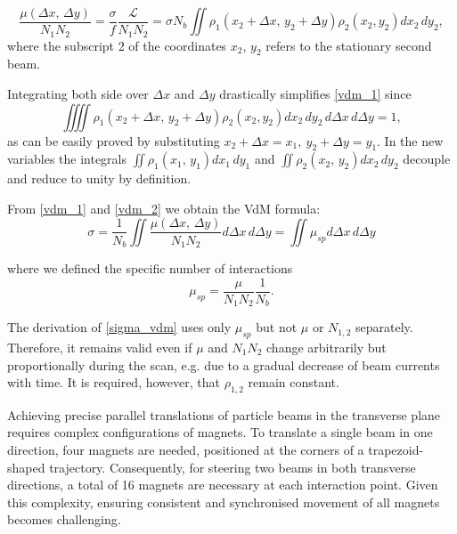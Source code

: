 \begin{equation}
\frac{\mu (\Delta x,\, \Delta y)}{N_1N_2} = \frac{\sigma}{f} \frac{\mathcal{L}}{N_1N_2} = \sigma N_b \iint \rho _1(x_2 + \Delta x,\, y_2 + \Delta y) \rho _2(x_2,y_2) dx_2\, dy_2, \label{vdm_1}
\end{equation}
where the subscript 2 of the coordinates $x_2$, $y_2$ refers to the stationary second beam.

Integrating both side over $\Delta x$ and $\Delta y$ drastically simplifies \eqref{vdm_1} since
\begin{equation} \iiiint \rho _1(x_2 {+} \Delta x,\, y_2 {+} \Delta y) \rho _2(x_2,y_2) dx_2\, dy_2\, d\Delta x\, d\Delta y {=} 1, \label{vdm_2} \end{equation}
as can be easily proved by substituting $x_2+\Delta x=x_1,\ y_2+\Delta y=y_1$. In the new variables the integrals $\iint \rho _1(x_1,\, y_1)dx_1\,dy_1$ and $\iint \rho _2(x_2,\, y_2)dx_2\,dy_2$ decouple and reduce to unity by definition.

From \eqref{vdm_1} and \eqref{vdm_2} we obtain the VdM formula:
\begin{equation}
     \sigma = \frac{1}{N_b} \iint \frac{\mu (\Delta x,\, \Delta y)}{N_1N_2} d\Delta x\, d\Delta y= \iint \mu_{sp}d\Delta x\, d \Delta y \label{sigma_vdm}
    \end{equation}

where we defined the specific number of interactions
\begin{equation}
\mu_{sp}=\frac{\mu}{N_1 N_2}\frac{1}{N_b}.\label{mu_sp}
\end{equation}

The derivation of \eqref{sigma_vdm} uses only $\mu _{sp}$ but not $\mu$ or $N_{1,2}$ separately. Therefore, it remains valid even if $\mu$ and $N_1N_2$ change arbitrarily but proportionally during the scan, e.g. due to a gradual decrease of beam currents with time. It is required, however, that $\rho_{1,2}$ remain constant.

Achieving precise parallel translations of particle beams in the transverse plane requires complex configurations of magnets. To translate a single beam in one direction, four magnets are needed, positioned at the corners of a trapezoid-shaped trajectory. Consequently, for steering two beams in both transverse directions, a total of 16 magnets are necessary at each interaction point. Given this complexity, ensuring consistent and synchronised movement of all magnets becomes challenging.

